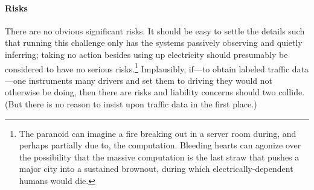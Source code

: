 


\paragraph{Risks}
There are no obvious significant risks.
It should be easy to settle the details such that running this
challenge only has the systems passively observing and quietly
inferring; taking no action besides using up
electricity should presumably be considered to have no serious risks.\footnote{The paranoid can imagine a fire breaking out in a server room during,
and perhaps partially due to, the computation.  Bleeding hearts can
agonize over the possibility that the massive computation is the last
straw that pushes a major city into a sustained brownout, during which
electrically-dependent humans would die.}
Implausibly, if---to obtain
labeled traffic data---one instruments many drivers and set them to
driving they would not otherwise be doing, then there are risks and
liability concerns should two collide.  (But there is no reason to
insist upon traffic data in the first place.)

